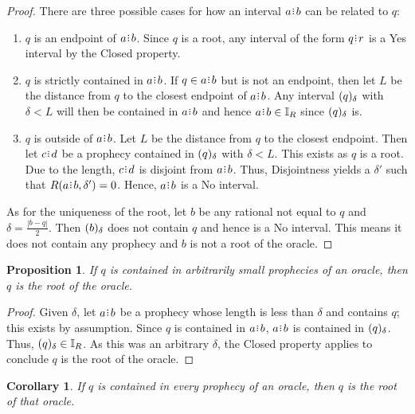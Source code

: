 \documentclass[12pt]{article}
\newtheorem{corollary}{Corollary}[section]
\newtheorem{proposition}{Proposition}[section]
\begin{document}
\begin{proof}
    There are three possible cases for how an interval $a\rint b$ can be related to $q$: 

    \begin{enumerate}
        \item $q$ is an endpoint of $a\rint b$. Since $q$ is a root, any interval of the form $q\rint r$ is a Yes interval by the Closed property.
        \item $q$ is strictly contained in $a\rint b$. If $q \in a\rint b$ but is not an endpoint, then let $L$ be the distance from $q$ to the closest endpoint of $a\rint b$. Any interval $(q)_{\delta}$ with $\delta < L $ will then be contained in $a\rint b$ and hence $a\rint b \in \mathbb{I}_R$ since $(q)_{\delta}$ is. 
        \item $q$ is outside of $a\rint b$.  Let $L$ be the distance from $q$ to the closest endpoint. Then let $c\rint d$ be a prophecy contained in $(q)_{\delta}$ with $\delta < L$. This exists as $q$ is a root. Due to the length, $c\rint d$ is disjoint from $a\rint b$. Thus, Disjointness yields a $\delta'$ such that $R(a\rint b, \delta')= 0$. Hence, $a\rint b$ is a No interval. 
    \end{enumerate}
    
    As for the uniqueness of the root, let $b$ be any rational not equal to $q$ and $\delta = \frac{|b-q|}{2}$. Then $(b)_{\delta}$ does not contain $q$ and hence is a No interval. This means it does not contain any prophecy and $b$ is not a root of the oracle. 
\end{proof}


\begin{proposition}\label{os-rootsmallpro}
    If $q$ is contained in arbitrarily small prophecies of an oracle, then $q$ is the root of the oracle. 
\end{proposition}

\begin{proof}
    Given $\delta$, let $a\rint b$ be a prophecy whose length is less than $\delta$ and contains $q$; this exists by assumption. Since $q$ is contained in $a\rint b$, $a\rint b$ is contained in $(q)_{\delta}$. Thus, $(q)_{\delta} \in \mathbb{I}_R$. As this was an arbitrary $\delta$, the Closed property applies to conclude  $q$ is the root of the oracle. 
\end{proof}

\begin{corollary}\label{os-root}
    If $q$ is contained in every prophecy of an oracle, then $q$ is the root of that oracle. 
\end{corollary}
\end{document}
